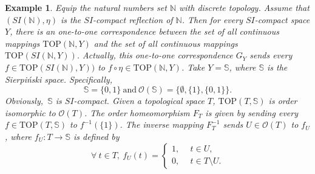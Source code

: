 \documentclass[preprint,12pt]{elsarticle}
\numberwithin{equation}{section}
\newtheorem{example}[theorem]{Example}
\begin{document}
\begin{example} {\rm Equip the natural numbers set $\mathbb{N}$ with discrete topology. Assume that $(SI(\mathbb{N}),\eta)$ is the $SI$-compact reflection of $\mathbb{N}$. Then for every $SI$-compact space $Y$, there is an one-to-one correspondence between the set of all continuous mappings $\mathrm{TOP}(\mathbb{N},Y)$ and the set of all continuous mappings $\mathrm{TOP}(SI(\mathbb{N},Y))$. Actually, this one-to-one correspondence $G_{Y}$ sends every $f\in\mathrm{TOP}(SI(\mathbb{N}),Y))$ to $f\circ\eta\in\mathrm{TOP}(\mathbb{N},Y)$. Take $Y=\mathbb{S}$, where $\mathbb{S}$ is the Sierpi\'{n}ski space. Specifically,
$$\mathbb{S}=\{0,1\}\ \mbox{and}\ \mathcal{O}(\mathbb{S})=\{\emptyset,\{1\},\{0,1\}\}.$$
Obviously,\ $\mathbb{S}$ is $SI$-compact. Given a topological space $T$, $\mathrm{TOP}(T,\mathbb{S})$ is order isomorphic to $\mathcal{O}(T)$. The order homeomorphism $F_{T}$ is given by sending every $f\in\mathrm{TOP}(T,\mathbb{S})$ to $f^{-1}(\{1\})$. The inverse mapping $F^{-1}_{T}$ sends $U\in\mathcal{O}(T)$ to $f_{U}$, where $f_{U}: T\longrightarrow\mathbb{S}$ is defined by
 $$\forall \ t\in T, \ f_{U}(t)=\left\{
             \begin{array}{ll}
              1, &\ \ t\in U, \\
              0, &\ \ t\in T\setminus U.
             \end{array}
           \right.$$

}
\end{example}
\end{document}
